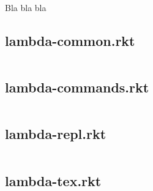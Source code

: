 Bla bla bla

\subsection{lambda-common.rkt}
\inputminted[mathescape,fontsize=\footnotesize]{racket}{../../texlambda/lambda-common.rkt}

\subsection{lambda-commands.rkt}
\inputminted[mathescape,fontsize=\footnotesize]{racket}{../../texlambda/lambda-commands.rkt}

\subsection{lambda-repl.rkt}
\inputminted[mathescape,fontsize=\footnotesize]{racket}{../../texlambda/lambda-repl.rkt}

\subsection{lambda-tex.rkt}
\inputminted[mathescape,fontsize=\footnotesize]{racket}{../../texlambda/lambda-tex.rkt}


